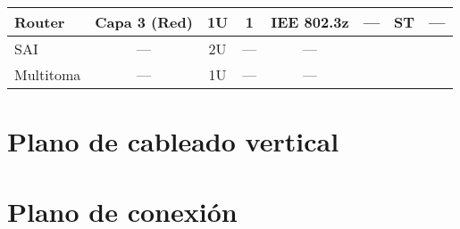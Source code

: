 \begin{table}[h]
{\begin{tabular}{|l|c|c|c|clcc}
Router                             & Capa 3 (Red)                           & 1U                                   & 1                                        & \multicolumn{1}{c|}{IEE 802.3z}        & \multicolumn{1}{c|}{---}                                                                                & \multicolumn{1}{c|}{ST}                     & \multicolumn{1}{c|}{---}                \\ \hline
SAI                                & ---                                    & 2U                                   & ---                                      & \multicolumn{1}{c|}{---}               & \multicolumn{1}{l|}{}                                                                                   & \multicolumn{1}{l|}{}                       & \multicolumn{1}{l|}{}                   \\ \hline
Multitoma                          & ---                                    & 1U                                   & ---                                      & \multicolumn{1}{c|}{---}               & \multicolumn{1}{l|}{}                                                                                   & \multicolumn{1}{l|}{}                       & \multicolumn{1}{l|}{}                   \\ \hline
\end{tabular}%
}
\end{table}

\section{Plano de cableado vertical}
\section{Plano de conexión}